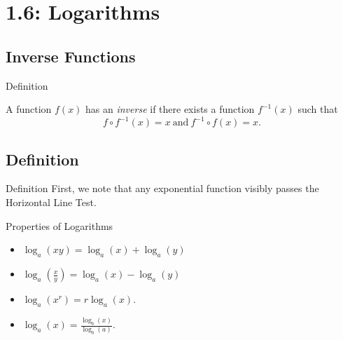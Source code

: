 \documentclass[Lecture.tex]{subfiles}
\begin{document}
\section{1.6: Logarithms}

\subsection{Inverse Functions}

\begin{frame}{Definition}
  \begin{defn}
    A function $f(x)$ has an {\it inverse} if there exists a function $f^{-1}(x)$ such that
    $$f \circ f^{-1}(x) = x\ \text{and}\ f^{-1} \circ f(x) = x.$$
  \end{defn}
  
\end{frame}

\subsection{Definition}

\begin{frame}{Definition}
  First, we note that any exponential function visibly passes the Horizontal Line Test.
\end{frame}

\begin{frame}{Properties of Logarithms}
\begin{itemize}
  \item<1->
    $\log_a(xy) = \log_a(x) + \log_a(y)$
  \item<2->
    $\log_a\left(\frac{x}{y}\right) = \log_a(x) - \log_a(y)$
  \item<3->
    $\log_a\left(x^r\right) = r\log_a(x)$.
  \item<4->
    $\log_a(x) = \frac{\log_b(x)}{\log_b(a)}$.
\end{itemize}
\end{frame}
\end{document}
